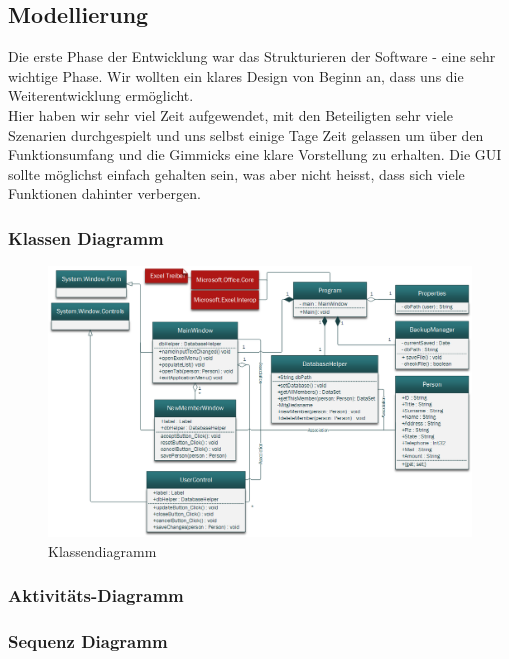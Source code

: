 \documentclass{article}
\begin{document}
\subsection{Modellierung}
Die erste Phase der Entwicklung war das Strukturieren der Software - eine sehr wichtige Phase. Wir wollten ein klares Design von Beginn an, dass uns die Weiterentwicklung ermöglicht.\\
Hier haben wir sehr viel Zeit aufgewendet, mit den Beteiligten sehr viele Szenarien durchgespielt und uns selbst einige Tage Zeit gelassen um über den Funktionsumfang und die Gimmicks eine klare Vorstellung zu erhalten. Die GUI sollte möglichst einfach gehalten sein, was aber nicht heisst, dass sich viele Funktionen dahinter verbergen. 

\subsubsection{Klassen Diagramm}
	
\begin{figure}
	\centering
	\includegraphics[width=1.05 \textwidth]{KlassendiagrammBild}
	\caption{Klassendiagramm}
\end{figure}

\subsubsection{Aktivitäts-Diagramm}

\subsubsection{Sequenz Diagramm}

\newpage
\end{document}
